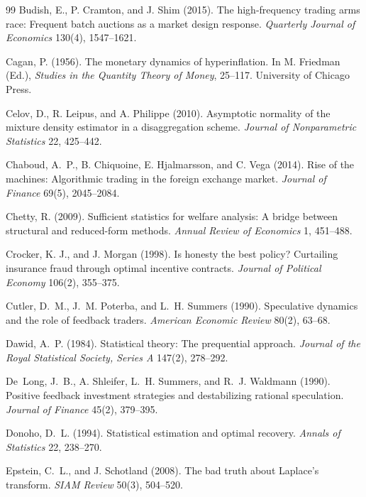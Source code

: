 \documentclass[12pt]{article}
\theoremstyle{definition}
\theoremstyle{remark}
\begin{document}
\begin{thebibliography}{99}
 Budish, E., P. Cramton, and J. Shim (2015). The high-frequency trading arms race: Frequent batch auctions as a market design response. \emph{Quarterly Journal of Economics} 130(4), 1547--1621.

 Cagan, P. (1956). The monetary dynamics of hyperinflation. In M. Friedman (Ed.), \emph{Studies in the Quantity Theory of Money}, 25--117. University of Chicago Press.

 Celov, D., R. Leipus, and A. Philippe (2010). Asymptotic normality of the mixture density estimator in a disaggregation scheme. \emph{Journal of Nonparametric Statistics} 22, 425--442.

 Chaboud, A.~P., B. Chiquoine, E. Hjalmarsson, and C. Vega (2014). Rise of the machines: Algorithmic trading in the foreign exchange market. \emph{Journal of Finance} 69(5), 2045--2084.

 Chetty, R. (2009). Sufficient statistics for welfare analysis: A bridge between structural and reduced-form methods. \emph{Annual Review of Economics} 1, 451--488.

 Crocker, K. J., and J. Morgan (1998). Is honesty the best policy? Curtailing insurance fraud through optimal incentive contracts. \emph{Journal of Political Economy} 106(2), 355--375.

 Cutler, D.~M., J.~M. Poterba, and L.~H. Summers (1990). Speculative dynamics and the role of feedback traders. \emph{American Economic Review} 80(2), 63--68.

 Dawid, A.~P. (1984). Statistical theory: The prequential approach. \emph{Journal of the Royal Statistical Society, Series A} 147(2), 278--292.

 De~Long, J.~B., A. Shleifer, L.~H. Summers, and R.~J. Waldmann (1990). Positive feedback investment strategies and destabilizing rational speculation. \emph{Journal of Finance} 45(2), 379--395.

 Donoho, D.~L. (1994). Statistical estimation and optimal recovery. \emph{Annals of Statistics} 22, 238--270.

 Epstein, C.~L., and J. Schotland (2008). The bad truth about Laplace's transform. \emph{SIAM Review} 50(3), 504--520.


\end{thebibliography}
\end{document}
